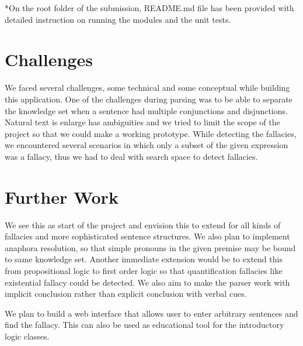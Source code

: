 \documentclass[14pt, english]{article}
\begin{document}
\medskip{}


{*}On the root folder of the submission, README.md file has been provided
with detailed instruction on running the modules and the unit tests.

\section{Challenges}
We faced several challenges, some technical and some conceptual while building this application. One of the challenges during parsing was to be able to separate the knowledge set when a sentence had multiple conjunctions and disjunctions. Natural text is enlarge has ambiguities and we tried to limit the scope of the project so that we could make a working prototype. While detecting the fallacies, we encountered several scenarios in which only a subset of the given expression was a fallacy, thus we had to deal with search space to detect fallacies.  

\section{Further Work}

We see this as start of the project and envision this to extend for
all kinds of fallacies and more sophisticated sentence structures. We 
also plan to implement anaphora resolution, so that simple pronouns
in the given premise may be bound to same knowledge set. Another immediate
extension would be to extend this from propositional logic to first
order logic so that quantification fallacies like existential fallacy
could be detected. We also aim to make the parser work with implicit
conclusion rather than explicit conclusion with verbal cues.
 
\medskip{}
We plan to build a web interface that allows user to enter arbitrary sentences and find the fallacy. This can also be used as educational tool for the introductory logic classes.
\end{document}
